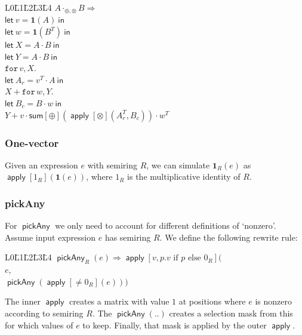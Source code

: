 \documentclass{article}
\DeclareMathOperator{\pickAny}{\mathsf{pickAny}}
\newcommand{\transp}[1]{#1^T}
\newcommand{\SyntaxStyle}{\mathsf}
\newcommand{\rowdom}{\mathbf{1}}
\DeclareMathOperator{\Apply}{\mathsf{apply}}
\newcommand{\one}{\rowdom}
\begin{document}
\begin{tabbing}
    L0\=L1\=L2\=L3\=L4 \kill
    $A \cdot_{\oplus,\otimes} B \Rightarrow$\\
    $\SyntaxStyle{let}\ v = \one(A) \ \SyntaxStyle{in}$ \\
    $\SyntaxStyle{let}\ w = \one(\transp{B}) \ \SyntaxStyle{in}$ \\
    $\SyntaxStyle{let}\ X = A \cdot B \ \SyntaxStyle{in}$ \\
    $\SyntaxStyle{let}\ Y = A \cdot B \ \SyntaxStyle{in}$ \\
    $\texttt{for}\, v,X \texttt{.}\,$\\
    \>$\SyntaxStyle{let}\ A_r = \transp{v} \cdot A \ \SyntaxStyle{in}$ \\
    \>$X + \texttt{for}\, w,Y \texttt{.}\,$\\
    \>\>$\SyntaxStyle{let}\ B_c = B \cdot w \ \SyntaxStyle{in}$ \\
    \>\>$Y + v \cdot \mathsf{sum}[\oplus](\Apply[\otimes](\transp{A_r}, B_c)) \cdot \transp{w}$
\end{tabbing}

\subsubsection*{One-vector}
Given an expression $e$ with semiring $R$, we can simulate $\one_R(e)$ as $\Apply[1_R](\rowdom(e))$, where $1_R$ is the multiplicative identity of $R$.

\subsubsection*{pickAny}
For $\pickAny$ we only need to account for different definitions of `nonzero'.
Assume input expression $e$ has semiring $R$.
We define the following rewrite rule:

\begin{tabbing}
    L0\=L1\=L2\=L3\=L4 \kill
    $\pickAny_R(e) \Rightarrow \Apply[v,p. v \text{ if } p \text{ else } 0_R]($\\
        \>$e,$\\
        \>$\pickAny(\Apply[\neq 0_R](e)))$
\end{tabbing}

The inner $\Apply$ creates a matrix with value $1$ at positions where $e$ is nonzero according to semiring $R$.
The $\pickAny(..)$ creates a selection mask from this for which values of $e$ to keep.
Finally, that mask is applied by the outer $\Apply$.
\end{document}
